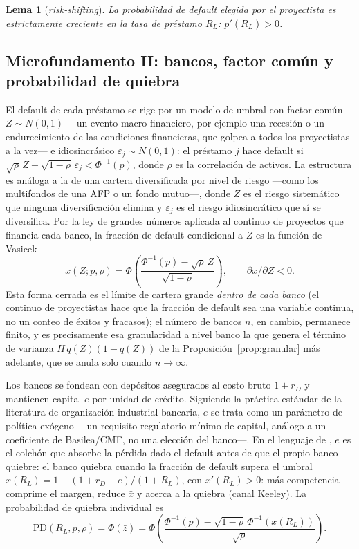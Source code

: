 \documentclass[11pt]{article}
\theoremstyle{plain}
\newtheorem{lemma}{Lema}
\theoremstyle{definition}
\theoremstyle{remark}
\newcommand{\PD}{\mathrm{PD}}
\newcommand{\1}{\mathbf{1}}
\begin{document}
\begin{lemma}[\textit{risk-shifting}]\label{lem:rs}
La probabilidad de default elegida por el proyectista es estrictamente creciente en la tasa de
préstamo $R_L$: $p'(R_L)>0$.
\end{lemma}

\subsection{Microfundamento II: bancos, factor común y probabilidad de quiebra}\label{sec:bancos}
El default de cada préstamo se rige por un modelo de umbral con factor común $Z\sim N(0,1)$
—un evento macro-financiero, por ejemplo una recesión o un endurecimiento de las condiciones
financieras, que golpea a todos los proyectistas a la vez— e idiosincrásico
$\varepsilon_j\sim N(0,1)$: el préstamo $j$ hace default si
$\sqrt{\rho}\,Z+\sqrt{1-\rho}\,\varepsilon_j<\Phi^{-1}(p)$, donde $\rho$ es la correlación de
activos. La estructura es análoga a la de una cartera diversificada por nivel de riesgo —como
los multifondos de una AFP o un fondo mutuo—, donde $Z$ es el riesgo sistemático que ninguna
diversificación elimina y $\varepsilon_j$ es el riesgo idiosincrático que sí se diversifica. Por
la ley de grandes números aplicada al continuo de proyectos que financia cada banco, la fracción
de default condicional a $Z$ es la función de Vasicek \citep{Vasicek2002,Gordy2003}
\begin{equation}
x(Z;p,\rho)=\Phi\!\left(\frac{\Phi^{-1}(p)-\sqrt{\rho}\,Z}{\sqrt{1-\rho}}\right),\qquad \partial x/\partial Z<0.
\label{eq:vasicek}
\end{equation}
Esta forma cerrada es el límite de cartera grande \emph{dentro de cada banco} (el continuo de
proyectistas hace que la fracción de default sea una variable continua, no un conteo de éxitos
y fracasos); el número de bancos $n$, en cambio, permanece finito, y es precisamente esa
granularidad a nivel banco la que genera el término de varianza $H\,q(Z)(1-q(Z))$ de la
Proposición~\ref{prop:granular} más adelante, que se anula solo cuando $n\to\infty$.

Los bancos se fondean con depósitos asegurados al costo bruto $1+r_D$ y mantienen capital $e$
por unidad de crédito. Siguiendo la práctica estándar de la literatura de organización
industrial bancaria, $e$ se trata como un parámetro de política exógeno —un requisito
regulatorio mínimo de capital, análogo a un coeficiente de Basilea/CMF, no una elección del
banco—. En el lenguaje de \citet{Merton1974}, $e$ es el colchón que absorbe la pérdida dado el
default antes de que el propio banco quiebre: el banco quiebra cuando la fracción de default
supera el umbral $\bar x(R_L)=1-(1+r_D-e)/(1+R_L)$, con $\bar x'(R_L)>0$: más competencia
comprime el margen, reduce $\bar x$ y acerca a la quiebra (canal Keeley). La probabilidad de
quiebra individual es
\begin{equation}
\PD(R_L,p,\rho)=\Phi(\bar z)=\Phi\!\left(\frac{\Phi^{-1}(p)-\sqrt{1-\rho}\,\Phi^{-1}(\bar x(R_L))}{\sqrt{\rho}}\right).
\label{eq:pd}
\end{equation}
\end{document}
